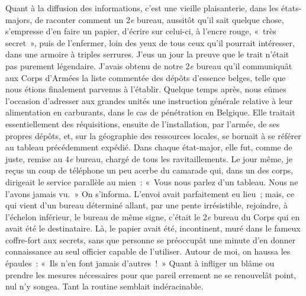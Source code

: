 \documentclass[french,twoside]{book} %
\begin{document}
Quant à la diffusion des informations, c’est une vieille plaisanterie, dans les états-majors, de raconter comment un 2\emph{e} bureau, aussitôt qu’il sait quelque chose, s’empresse d’en faire un papier, d’écrire sur celui-ci, à l’encre rouge, « très secret », puis de l’enfermer, loin des yeux de tous ceux qu’il pourrait intéresser, dans une armoire à triples serrures. J’eus un jour la preuve que le trait n’était pas purement légendaire. J’avais obtenu de notre 2\emph{e} bureau qu’il communiquât aux Corps d’Armées la liste commentée des dépôts d’essence belges, telle que nous étions finalement parvenus à l’établir. Quelque temps après, nous eûmes l’occasion d’adresser aux grandes unités une instruction générale relative à leur alimentation en carburants, dans le cas de pénétration en Belgique. Elle traitait essentiellement des réquisitions, ensuite de l’installation, par l’armée, de ses propres dépôts, et, sur la géographie des ressources locales, se bornait à se référer au tableau précédemment expédié. Dans chaque état-major, elle fut, comme de juste, remise au 4\emph{e} bureau, chargé de tous les ravitaillements. Le jour même, je reçus un coup de téléphone un peu acerbe du camarade qui, dans un des corps, dirigeait le service parallèle au mien : « Vous nous parlez d’un tableau. Nous ne l’avons jamais vu. » On s’informa. L’envoi avait parfaitement eu lieu ; mais, ce qui vient d’un bureau   déterminé allant, par une pente irrésistible, rejoindre, à l’échelon inférieur, le bureau de même signe, c’était le 2\emph{e} bureau du Corps qui en avait été le destinataire. Là, le papier avait été, incontinent, muré dans le fameux coffre-fort aux secrets, sans que personne se préoccupât une minute d’en donner connaissance au seul officier capable de l’utiliser. Autour de moi, on haussa les épaules : « Ils n’en font jamais d’autres ! » Quant à infliger un blâme ou prendre les mesures nécessaires pour que pareil errement ne se renouvelât point, nul n’y songea. Tant la routine semblait indéracinable.\par
\end{document}
